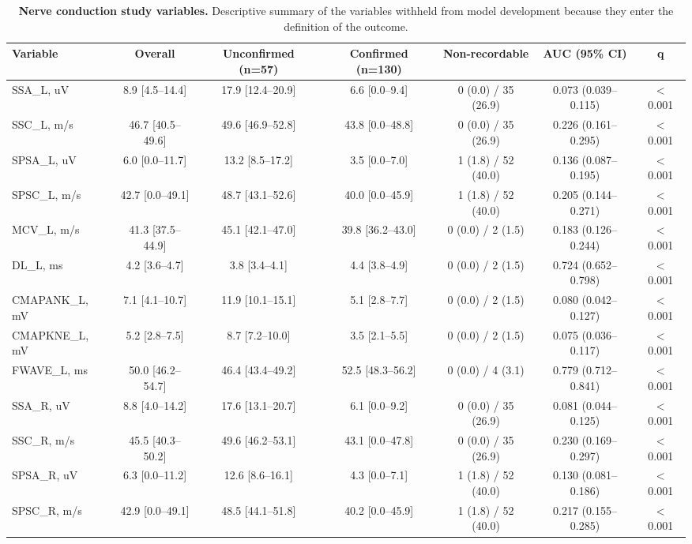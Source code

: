 \begin{table}[!ht]
\centering
\footnotesize
\caption{\textbf{Nerve conduction study variables.} Descriptive summary of the variables withheld from model development because they enter the definition of the outcome.}
\label{tab:ncs}
\begin{tabular}{lcccccc}
\toprule
\textbf{Variable} & \textbf{Overall} & \textbf{Unconfirmed} (n=57) & \textbf{Confirmed} (n=130) & \textbf{Non-recordable} & \textbf{AUC (95\% CI)} & \textbf{q} \\
\midrule
SSA\_L, uV & 8.9 [4.5--14.4] & 17.9 [12.4--20.9] & 6.6 [0.0--9.4] & 0 (0.0) / 35 (26.9) & 0.073 (0.039--0.115) & $<$0.001 \\
SSC\_L, m/s & 46.7 [40.5--49.6] & 49.6 [46.9--52.8] & 43.8 [0.0--48.8] & 0 (0.0) / 35 (26.9) & 0.226 (0.161--0.295) & $<$0.001 \\
SPSA\_L, uV & 6.0 [0.0--11.7] & 13.2 [8.5--17.2] & 3.5 [0.0--7.0] & 1 (1.8) / 52 (40.0) & 0.136 (0.087--0.195) & $<$0.001 \\
SPSC\_L, m/s & 42.7 [0.0--49.1] & 48.7 [43.1--52.6] & 40.0 [0.0--45.9] & 1 (1.8) / 52 (40.0) & 0.205 (0.144--0.271) & $<$0.001 \\
MCV\_L, m/s & 41.3 [37.5--44.9] & 45.1 [42.1--47.0] & 39.8 [36.2--43.0] & 0 (0.0) / 2 (1.5) & 0.183 (0.126--0.244) & $<$0.001 \\
DL\_L, ms & 4.2 [3.6--4.7] & 3.8 [3.4--4.1] & 4.4 [3.8--4.9] & 0 (0.0) / 2 (1.5) & 0.724 (0.652--0.798) & $<$0.001 \\
CMAPANK\_L, mV & 7.1 [4.1--10.7] & 11.9 [10.1--15.1] & 5.1 [2.8--7.7] & 0 (0.0) / 2 (1.5) & 0.080 (0.042--0.127) & $<$0.001 \\
CMAPKNE\_L, mV & 5.2 [2.8--7.5] & 8.7 [7.2--10.0] & 3.5 [2.1--5.5] & 0 (0.0) / 2 (1.5) & 0.075 (0.036--0.117) & $<$0.001 \\
FWAVE\_L, ms & 50.0 [46.2--54.7] & 46.4 [43.4--49.2] & 52.5 [48.3--56.2] & 0 (0.0) / 4 (3.1) & 0.779 (0.712--0.841) & $<$0.001 \\
SSA\_R, uV & 8.8 [4.0--14.2] & 17.6 [13.1--20.7] & 6.1 [0.0--9.2] & 0 (0.0) / 35 (26.9) & 0.081 (0.044--0.125) & $<$0.001 \\
SSC\_R, m/s & 45.5 [40.3--50.2] & 49.6 [46.2--53.1] & 43.1 [0.0--47.8] & 0 (0.0) / 35 (26.9) & 0.230 (0.169--0.297) & $<$0.001 \\
SPSA\_R, uV & 6.3 [0.0--11.2] & 12.6 [8.6--16.1] & 4.3 [0.0--7.1] & 1 (1.8) / 52 (40.0) & 0.130 (0.081--0.186) & $<$0.001 \\
SPSC\_R, m/s & 42.9 [0.0--49.1] & 48.5 [44.1--51.8] & 40.2 [0.0--45.9] & 1 (1.8) / 52 (40.0) & 0.217 (0.155--0.285) & $<$0.001 \\

\end{tabular}
\end{table}
